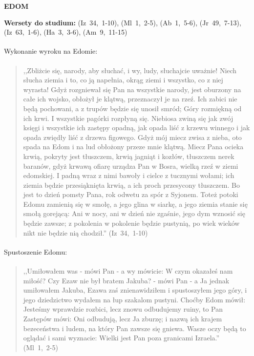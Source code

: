 \documentclass[10pt,a4paper,oneside]{article}
\begin{document}
\centerline{\textbf{\MakeUppercase{Edom}}}
\begin{center}
\textbf{Wersety do studium:} 
\mbox{(Iz 34, 1-10)}, \mbox{(Ml 1, 2-5)}, \mbox{(Ab 1, 5-6)}, \mbox{(Jr 49, 7-13)}, \mbox{(Iz 63, 1-6)}, \mbox{(Ha 3, 3-6)}, \mbox{(Am 9, 11-15)}
\end{center}
\paragraph{}
Wykonanie wyroku na Edomie:
\paragraph{}
\begin{quote}
,,Zbliżcie się, narody, aby słuchać, i wy, ludy, słuchajcie uważnie! Niech słucha ziemia i to, co ją napełnia, okrąg ziemi i wszystko, co z niej wyrasta! Gdyż rozgniewał się Pan na wszystkie narody, jest oburzony na całe ich wojsko, obłożył je klątwą, przeznaczył je na rzeź. Ich zabici nie będą pochowani, a z trupów będzie się unosił smród; Góry rozmiękną od ich krwi. I wszystkie pagórki rozpłyną się. Niebiosa zwiną się jak zwój księgi i wszystkie ich zastępy opadną, jak opada liść z krzewu winnego i jak opada zwiędły liść z drzewa figowego. Gdyż mój miecz zwisa z nieba, oto spada na Edom i na lud obłożony przeze mnie klątwą. Miecz Pana ocieka krwią, pokryty jest tłuszczem, krwią jagniąt i kozłów, tłuszczem nerek baranów, gdyż krwawą ofiarę urządza Pan w Bosra, wielką rzeź w ziemi edomskiej. I padną wraz z nimi bawoły i cielce z tucznymi wołami; ich ziemia będzie przesiąknięta krwią, a ich proch przesycony tłuszczem. Bo jest to dzień pomsty Pana, rok odwetu za spór z Syjonem. Toteż potoki Edomu zamienią się w smołę, a jego glina w siarkę, a jego ziemia stanie się smołą gorejącą: Ani w nocy, ani w dzień nie zgaśnie, jego dym wznosić się będzie zawsze; z pokolenia w pokolenie będzie pustynią, po wiek wieków nikt nie będzie nią chodził.'' \mbox{(Iz 34, 1-10)}
\end{quote}
\paragraph{}
Spustoszenie Edomu:
\paragraph{}
\begin{quote}
,,Umiłowałem was - mówi Pan - a wy mówicie: W czym okazałeś nam miłość? Czy Ezaw nie był bratem Jakuba? - mówi Pan - a Ja jednak umiłowałem Jakuba, Ezawa zaś znienawidziłem i spustoszyłem jego góry, i jego dziedzictwo wydałem na łup szakalom pustyni. Choćby Edom mówił: Jesteśmy wprawdzie rozbici, lecz znowu odbudujemy ruiny, to Pan Zastępów mówi: Oni odbudują, lecz Ja zburzę; i nazwą ich krajem bezeceństwa i ludem, na który Pan zawsze się gniewa. Wasze oczy będą to oglądać i sami wyznacie: Wielki jest Pan poza granicami Izraela.'' \mbox{(Ml 1, 2-5)}
\end{quote}
\end{document}
